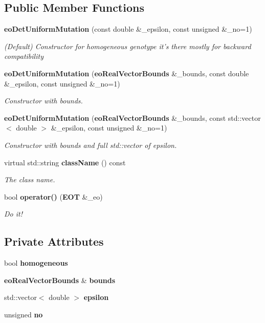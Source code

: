 \subsection*{Public Member Functions}
\begin{CompactItemize}
\item 
{\bf eo\-Det\-Uniform\-Mutation} (const double \&\_\-epsilon, const unsigned \&\_\-no=1)
\begin{CompactList}\small\item\em (Default) Constructor for homogeneous genotype it's there mostly for backward compatibility \item\end{CompactList}\item 
{\bf eo\-Det\-Uniform\-Mutation} ({\bf eo\-Real\-Vector\-Bounds} \&\_\-bounds, const double \&\_\-epsilon, const unsigned \&\_\-no=1)
\begin{CompactList}\small\item\em Constructor with bounds. \item\end{CompactList}\item 
{\bf eo\-Det\-Uniform\-Mutation} ({\bf eo\-Real\-Vector\-Bounds} \&\_\-bounds, const std::vector$<$ double $>$ \&\_\-epsilon, const unsigned \&\_\-no=1)
\begin{CompactList}\small\item\em Constructor with bounds and full std::vector of epsilon. \item\end{CompactList}\item 
virtual std::string {\bf class\-Name} () const \label{classeo_det_uniform_mutation_a3}

\begin{CompactList}\small\item\em The class name. \item\end{CompactList}\item 
bool {\bf operator()} ({\bf EOT} \&\_\-eo)
\begin{CompactList}\small\item\em Do it! \item\end{CompactList}\end{CompactItemize}
\subsection*{Private Attributes}
\begin{CompactItemize}
\item 
bool {\bf homogeneous}\label{classeo_det_uniform_mutation_r0}

\item 
{\bf eo\-Real\-Vector\-Bounds} \& {\bf bounds}\label{classeo_det_uniform_mutation_r1}

\item 
std::vector$<$ double $>$ {\bf epsilon}\label{classeo_det_uniform_mutation_r2}

\item 
unsigned {\bf no}\label{classeo_det_uniform_mutation_r3}

\end{CompactItemize}


